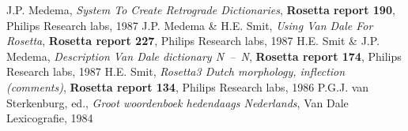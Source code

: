 \begin{thebibliography}{AAA99a}
  J.P. Medema, {\em System To Create Retrograde 
  Dictionaries}, {\bf Rosetta report 190}, Philips Research labs, 1987
  J.P. Medema \& H.E. Smit, {\em Using Van
  Dale For Rosetta}, {\bf Rosetta report 227}, Philips Research labs, 
  1987
  H.E. Smit \& J.P. Medema, {\em Description Van 
  Dale dictionary N~--~N}, {\bf Rosetta report 174}, Philips Research labs, 
  1987
  H.E. Smit, {\em Rosetta3 Dutch morphology,
  inflection (comments)}, {\bf Rosetta report 134}, Philips Research labs, 
  1986
  P.G.J. van Sterkenburg, ed., {\em Groot woordenboek 
  hedendaags Nederlands}, Van Dale Lexicografie, 1984
\end{thebibliography}


